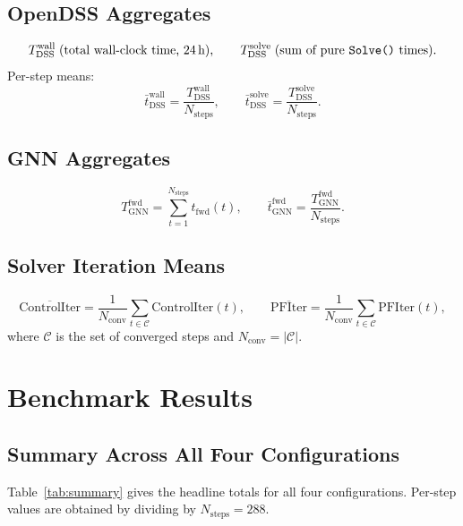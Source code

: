 \documentclass[11pt]{article}
\begin{document}
\subsection{OpenDSS Aggregates}

\[
T^{\text{wall}}_{\text{DSS}} \;\text{(total wall-clock time, 24\,h)},
\qquad
T^{\text{solve}}_{\text{DSS}} \;\text{(sum of pure \texttt{Solve()} times)}.
\]
Per-step means:
\[
\bar{t}^{\text{wall}}_{\text{DSS}}
  = \frac{T^{\text{wall}}_{\text{DSS}}}{N_{\text{steps}}},
\qquad
\bar{t}^{\text{solve}}_{\text{DSS}}
  = \frac{T^{\text{solve}}_{\text{DSS}}}{N_{\text{steps}}}.
\]

\subsection{GNN Aggregates}

\[
T^{\text{fwd}}_{\text{GNN}}
  = \sum_{t=1}^{N_{\text{steps}}} t_{\text{fwd}}(t),
\qquad
\bar{t}^{\text{fwd}}_{\text{GNN}}
  = \frac{T^{\text{fwd}}_{\text{GNN}}}{N_{\text{steps}}}.
\]

\subsection{Solver Iteration Means}

\[
\overline{\text{ControlIter}}
  = \frac{1}{N_{\text{conv}}}
    \sum_{t \in \mathcal{C}} \text{ControlIter}(t),
\qquad
\overline{\text{PFIter}}
  = \frac{1}{N_{\text{conv}}}
    \sum_{t \in \mathcal{C}} \text{PFIter}(t),
\]
where $\mathcal{C}$ is the set of converged steps and
$N_{\text{conv}} = |\mathcal{C}|$.

\section{Benchmark Results}

\subsection{Summary Across All Four Configurations}

Table~\ref{tab:summary} gives the headline totals for all four
configurations.  Per-step values are obtained by dividing by
$N_{\text{steps}} = 288$.
\end{document}
